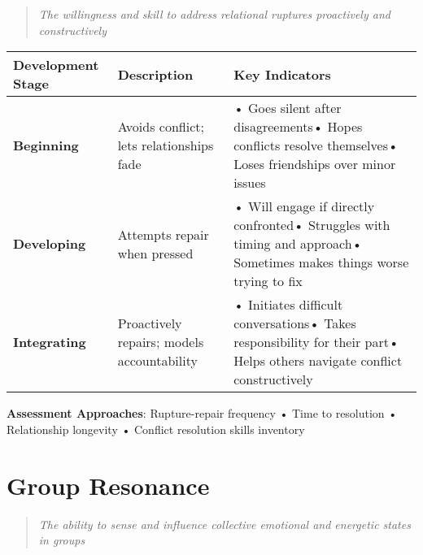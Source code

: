 \documentclass[
  a4paper,
]{report}
\begin{document}
\begin{quote}
\emph{The willingness and skill to address relational ruptures
proactively and constructively}
\end{quote}

\begin{longtable}[]{@{}
  >{\raggedright\arraybackslash}p{}
  >{\raggedright\arraybackslash}p{}
  >{\raggedright\arraybackslash}p{}@{}}
\toprule\noalign{}
\begin{minipage}[b]{\linewidth}\raggedright
Development Stage
\end{minipage} & \begin{minipage}[b]{\linewidth}\raggedright
Description
\end{minipage} & \begin{minipage}[b]{\linewidth}\raggedright
Key Indicators
\end{minipage} \\
\midrule\noalign{}
\endhead
\bottomrule\noalign{}
\endlastfoot
\textbf{Beginning} & Avoids conflict; lets relationships fade & • Goes
silent after disagreements• Hopes conflicts resolve themselves• Loses
friendships over minor issues \\
\textbf{Developing} & Attempts repair when pressed & • Will engage if
directly confronted• Struggles with timing and approach• Sometimes makes
things worse trying to fix \\
\textbf{Integrating} & Proactively repairs; models accountability & •
Initiates difficult conversations• Takes responsibility for their part•
Helps others navigate conflict constructively \\
\end{longtable}

\textbf{Assessment Approaches}: Rupture-repair frequency • Time to
resolution • Relationship longevity • Conflict resolution skills
inventory

\section{Group Resonance}

\begin{quote}
\emph{The ability to sense and influence collective emotional and
energetic states in groups}
\end{quote}
\end{document}
